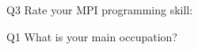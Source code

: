 \begin{description}%
\item{Q3} Rate your MPI programming skill:%
\item{Q1} What is your main occupation?%
\end{description}%
